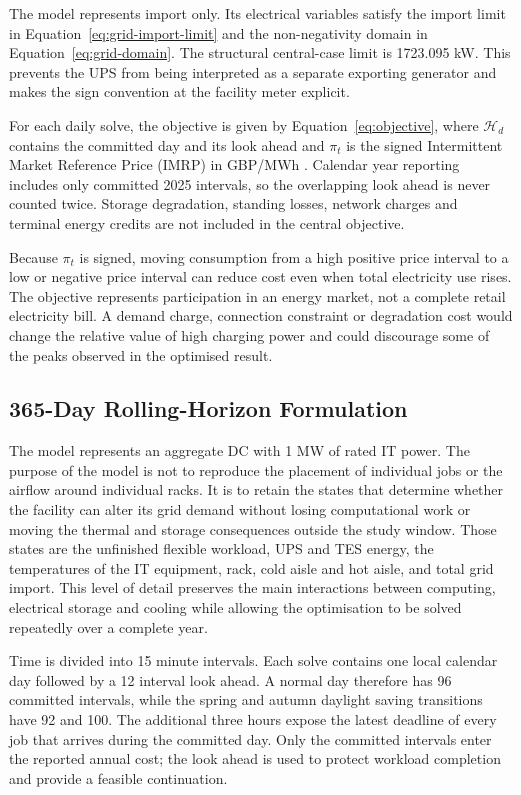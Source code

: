 The model represents import only. Its electrical variables satisfy
the import limit in Equation~\eqref{eq:grid-import-limit} and the non-negativity
domain in Equation~\eqref{eq:grid-domain}.
The structural central-case limit is 1723.095 kW. This prevents the UPS from
being interpreted as a separate exporting generator and makes the sign
convention at the facility meter explicit.

For each daily solve, the objective is given by Equation~\eqref{eq:objective},
where $\mathcal H_d$ contains the committed day and its look ahead and $\pi_t$
is the signed Intermittent Market Reference Price (IMRP) in GBP/MWh
\cite{lccc_imrp_actuals}. Calendar year reporting includes only committed
2025 intervals, so the overlapping look ahead is never counted twice. Storage
degradation, standing losses, network charges and terminal energy credits are
not included in the central objective.

Because $\pi_t$ is signed, moving consumption from a high positive price interval
to a low or negative price interval can reduce cost even when total electricity
use rises. The objective represents participation in an energy market,
not a complete retail electricity bill. A demand charge, connection constraint
or degradation cost would change the relative value of high charging power and
could discourage some of the peaks observed in the optimised result.


\subsection{365-Day Rolling-Horizon Formulation}\label{sec:annual-rolling}

The model represents an aggregate DC with 1 MW of rated IT power. The
purpose of the model is not to reproduce the placement of individual jobs or
the airflow around individual racks. It is to retain the states that determine
whether the facility can alter its grid demand without losing computational
work or moving the thermal and storage consequences outside the study window.
Those states are the unfinished flexible workload, UPS and TES energy, the
temperatures of the IT equipment, rack, cold aisle and hot aisle, and total grid
import. This level of detail preserves the main interactions between computing,
electrical storage and cooling while allowing the optimisation to be solved
repeatedly over a complete year.

Time is divided into 15 minute intervals. Each solve contains one local calendar
day followed by a 12 interval look ahead. A normal day therefore has 96
committed intervals, while the spring and autumn daylight saving transitions
have 92 and 100. The additional three hours expose the latest deadline of every
job that arrives during the committed day. Only the committed intervals enter
the reported annual cost; the look ahead is used to protect workload completion
and provide a feasible continuation.


